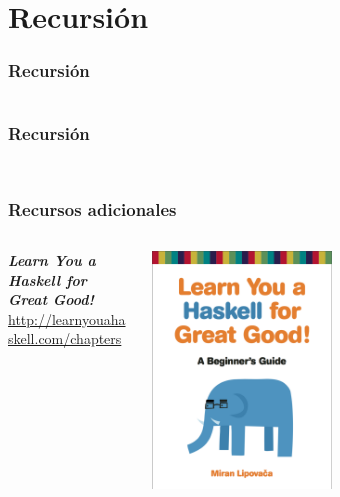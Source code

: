 \section{Recursión}
\begin{frame}[fragile]
  \frametitle{Recursión}
  {\color{white}
    \inputminted[bgcolor=bg]{haskell}{code/recursion01.hs}
  }
\end{frame}

\begin{frame}[fragile]
  \frametitle{Recursión}
  {\color{white}
    \inputminted[bgcolor=bg]{haskell}{code/recursion02.hs}
  }
  {\color{white}
    \inputminted[bgcolor=bg]{haskell}{code/recursion02.hs}
  }
\end{frame}


\begin{frame}
  \frametitle{Recursos adicionales}
  \begin{columns}
    \begin{column}{0.5\textwidth}
      \textbf{\textit{Learn You a Haskell for Great Good!}}\\
      \url{http://learnyouahaskell.com/chapters}
    \end{column}
    \begin{column}{0.5\textwidth}  %
      \begin{center}
        \includegraphics[width=0.5\textwidth]{img/LYH.png}
      \end{center}
    \end{column}
  \end{columns}
\end{frame}


